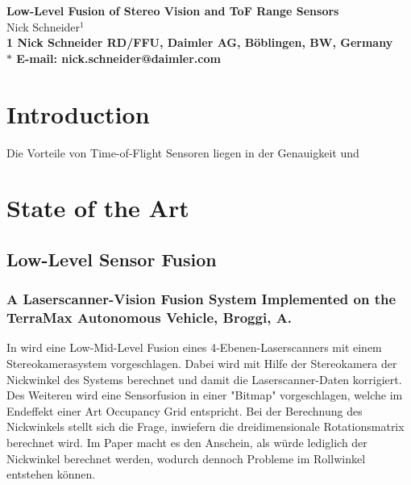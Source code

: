 \documentclass[10pt]{article}
\date{}
\begin{document}
\begin{flushleft}
{\Large
\textbf{Low-Level Fusion of Stereo Vision and ToF Range Sensors}
}
\\
Nick Schneider$^{1}$
\\
\bf{1} Nick Schneider RD/FFU, Daimler AG, Böblingen, BW, Germany
\\
$\ast$ E-mail: nick.schneider@daimler.com
\end{flushleft}



\section*{Introduction}

Die Vorteile von Time-of-Flight Sensoren liegen in der Genauigkeit und

\section*{State of the Art}


\subsection*{Low-Level Sensor Fusion}

\subsubsection*{A Laserscanner-Vision Fusion System Implemented on the TerraMax Autonomous Vehicle, Broggi, A. \cite{Broggi2006}}

In \cite{Broggi2006} wird eine Low-Mid-Level Fusion eines 4-Ebenen-Laserscanners mit einem Stereokamerasystem vorgeschlagen. Dabei wird mit Hilfe der Stereokamera der Nickwinkel des Systems berechnet und damit die Laserscanner-Daten korrigiert. Des Weiteren wird eine Sensorfusion in einer "Bitmap" vorgeschlagen, welche im Endeffekt einer Art Occupancy Grid entspricht.
Bei der Berechnung des Nickwinkels stellt sich die Frage, inwiefern die dreidimensionale Rotationsmatrix berechnet wird. Im Paper macht es den Anschein, als würde lediglich der Nickwinkel berechnet werden, wodurch dennoch Probleme im Rollwinkel entstehen können.
\end{document}
